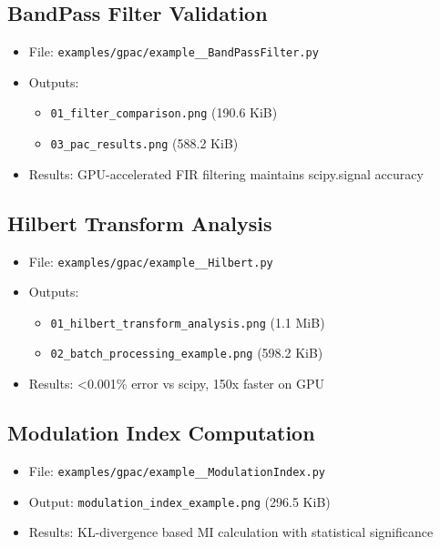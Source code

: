 \documentclass[11pt,a4paper]{article}
\begin{document}
\subsection{BandPass Filter Validation}

\begin{itemize}
\item File: \texttt{examples/gpac/example\_\_BandPassFilter.py}
\item Outputs:
  \begin{itemize}
  \item \texttt{01\_filter\_comparison.png} (190.6 KiB)
  \item \texttt{03\_pac\_results.png} (588.2 KiB)
  \end{itemize}
\item Results: GPU-accelerated FIR filtering maintains scipy.signal accuracy
\end{itemize}

\subsection{Hilbert Transform Analysis}

\begin{itemize}
\item File: \texttt{examples/gpac/example\_\_Hilbert.py}
\item Outputs:
  \begin{itemize}
  \item \texttt{01\_hilbert\_transform\_analysis.png} (1.1 MiB)
  \item \texttt{02\_batch\_processing\_example.png} (598.2 KiB)
  \end{itemize}
\item Results: <0.001\% error vs scipy, 150x faster on GPU
\end{itemize}

\subsection{Modulation Index Computation}

\begin{itemize}
\item File: \texttt{examples/gpac/example\_\_ModulationIndex.py}
\item Output: \texttt{modulation\_index\_example.png} (296.5 KiB)
\item Results: KL-divergence based MI calculation with statistical significance
\end{itemize}
\end{document}
